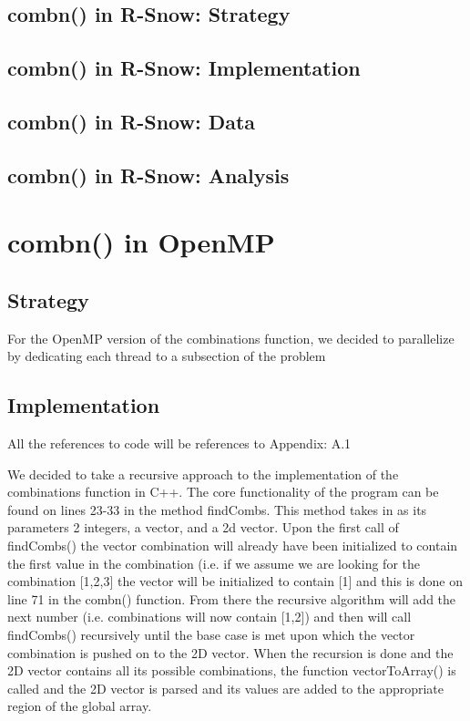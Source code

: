 \documentclass[titlepage, 11pt]{article}
\begin{document}
\subsection{combn() in R-Snow: Strategy}

\subsection{combn() in R-Snow: Implementation}


\subsection{combn() in R-Snow: Data}

\subsection{combn() in R-Snow: Analysis}

\section{combn() in OpenMP}
\subsection{Strategy}
For the OpenMP version of the combinations function, we decided to parallelize by dedicating each thread to a subsection of the problem 

\subsection{Implementation}

\begin{center}\textcolor{black!50}{All the references to code will be references to Appendix: A.1}\\ \end{center}
We decided to take a recursive approach to the implementation of the combinations function in C++. The core functionality of the program can be found on lines 23-33 in the method findCombs. This method takes in as its parameters 2 integers, a vector, and a 2d vector. Upon the first call of findCombs() the vector combination will already have been initialized to contain the first value in the combination (i.e. if we assume we are looking for the combination [1,2,3] the vector will be initialized to contain [1] and this is done on line 71 in the combn() function. From there the recursive algorithm will add the next number (i.e. combinations will now contain [1,2]) and then will call findCombs() recursively until the base case is met upon which the vector combination is pushed on to the 2D vector. When the recursion is done and the 2D vector contains all its possible combinations, the function vectorToArray() is called and the 2D vector is parsed and its values are added to the appropriate region of the global array. 
\end{document}
